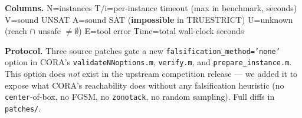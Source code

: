 \documentclass[10pt]{beamer}
\begin{document}
\begin{frame}[fragile]
\vspace{0.3em}
\centering\scriptsize
\textbf{Columns.}\;
N=instances\quad
T/i=per-instance timeout (max in benchmark, seconds)\quad
V=sound UNSAT\quad
A=sound SAT (\textbf{impossible} in TRUESTRICT)\quad
U=unknown (reach $\cap$ unsafe $\ne \emptyset$)\quad
E=tool error\quad
Time=total wall-clock seconds

\vspace{0.2em}
\centering\scriptsize
\textbf{Protocol.}\;
Three source patches gate a new \texttt{falsification\_method='none'} option in CORA's
\texttt{validateNNoptions.m}, \texttt{verify.m}, and \texttt{prepare\_instance.m}. This option
does \emph{not} exist in the upstream competition release — we added it to expose what CORA's
reachability does without any falsification heuristic (no \texttt{center}-of-box, no FGSM,
no \texttt{zonotack}, no random sampling). Full diffs in \texttt{patches/}.

\end{frame}
\end{document}
